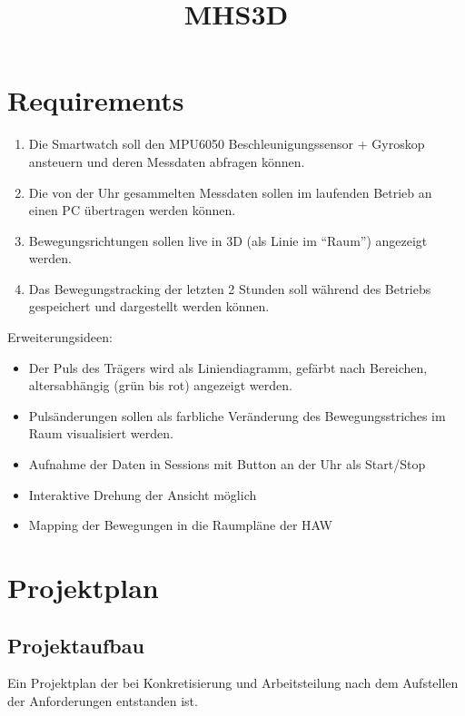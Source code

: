 \documentclass[a4paper, 11pt]{article}
\title{
    MHS3D
}
\begin{document}
\maketitle
\clearpage

\tableofcontents
\clearpage

%
\section{Requirements}
\begin{enumerate}
    \item Die Smartwatch soll den MPU6050 Beschleunigungssensor + Gyroskop ansteuern und deren Messdaten abfragen können.
    \item Die von der Uhr gesammelten Messdaten sollen im laufenden Betrieb an einen PC übertragen werden können.
    \item Bewegungsrichtungen sollen live in 3D (als Linie im “Raum”) angezeigt werden.
    \item Das Bewegungstracking der letzten 2 Stunden soll während des Betriebs gespeichert und dargestellt werden können.

\end{enumerate}

Erweiterungsideen:
\begin{itemize}
    \item Der Puls des Trägers  wird als Liniendiagramm, gefärbt nach Bereichen, altersabhängig (grün bis rot) angezeigt werden.
    \item Pulsänderungen sollen als farbliche Veränderung des Bewegungsstriches im Raum visualisiert werden.
    \item Aufnahme der Daten in Sessions mit Button an der Uhr als Start/Stop
    \item Interaktive Drehung der Ansicht möglich
    \item Mapping der Bewegungen in die Raumpläne der HAW
\end{itemize}
\clearpage


\section{Projektplan}
\subsection{Projektaufbau}
Ein Projektplan der bei Konkretisierung und Arbeitsteilung nach dem Aufstellen der Anforderungen entstanden ist.
\end{document}
